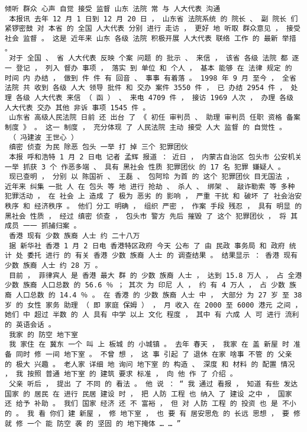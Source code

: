 \documentclass{article}
\begin{document}
\begin{Verbatim}[commandchars=\\\{\}]
 倾听 群众 心声 自觉 接受 监督 山东 法院 常 与 人大代表 沟通 
 本报讯 去年 12 月 1 日到 12 月 20 日 ， 山东省 法院系统 的 院长 、 副 院长 们 紧锣密鼓 对 本省 的 全国 人大代表 分别 进行 走访 ， 更好 地 听取 群众意见 ， 接受 社会 监督 。 这是 近年来 山东 各级 法院 积极开展 人大代表 联络 工作 的 最新 举措 。 
 对于 全国 、 省 人大代表 反映 个案 问题 的 批示 、 来信 ， 该省 各级 法院 都 逐一 登记 ， 列入 督办 事项 ， 落实 到 单位 和 个人 ， 基本 能够 在 法律 规定 的 时间 内 办结 ， 做到 件 件 有 回音 、 事事 有着落 。 1998 年 9 月 至今 ， 全省 法院 共 收到 各级 人大 领导 批件 和 交办 案件 3550 件 ， 已 办结 2954 件 ， 处理 各级 人大代表 来信 （ 函 ） 、 来电 4709 件 ， 接访 1969 人次 ， 办理 各级 人大代表 交办 其他 非诉 事项 1545 件 。 
 山东省 高级人民法院 日前 还 出台 了 《 初任 审判员 、 助理 审判员 任职 资格 备案 制度 》 。 这一 制度 ， 充分体现 了 人民法院 主动 接受 人大 监督 的 自觉性 。 
 （ 冯建波 王世心 ） 
 缜密 侦查 为民 除恶 包头 一举 打 掉 三个 犯罪团伙 
 本报 呼和浩特 1 月 2 日电 记者 孟辉 报道 ： 近日 ， 内蒙古自治区 包头市 公安机关 一举 抓获 3 个 作恶多端 、 具有 黑社会 性质 犯罪团伙 的 17 名 犯罪 嫌疑人 。 
 现已查明 ， 分别 以 陈国祈 、 王磊 、 包阿玲 为首 的 这个 犯罪团伙 目无国法 ， 近年来 纠集 一批 人 在 包头 等 地 进行 抢劫 、 杀人 、 绑架 、 敲诈勒索 等 多种 犯罪活动 ， 在 社会 上 造成 了 极为 恶劣 的 影响 ， 严重 干扰 和 破坏 了 社会治安 秩序 和 经济秩序 。 他们 分工 明确 ， 组织 严密 ， 作案 手段 残忍 ， 具有 明显 的 黑社会 性质 ， 经过 缜密 侦查 ， 包头市 警方 先后 摧毁 了 这个 犯罪团伙 ， 将 其 成员 一一 抓捕归案 。 
 香港 现有 少数 族裔 人士 约 二十八万 
 据 新华社 香港 1 月 2 日电 香港特区政府 今天 公布 了 由 民政 事务局 和 政府 统计 处 委托 进行 的 有关 香港 少数 族裔 人士 的 调查结果 。 结果显示 ： 香港 现有 少数 族裔 人士 约 28 万 。 
 目前 ， 菲律宾人 是 香港 最大 群 的 少数 族裔 人士 ， 达到 15.8 万人 ， 占 全港 少数 族裔 人口总数 的 56.6 ％ ； 其次 为 印尼 人 ， 约 有 4 万人 ， 占 少数 族裔 人口总数 的 14.4 ％ 。 在 香港 的 少数 族裔 人士 中 ， 大部分 为 27 岁 至 38 岁 的 女性 家务 助理 （ 即 家庭 保姆 ） ， 月 收入 在 2000 至 6000 港元 之间 ， 她们 中 超过 半数 的 人 具有 中学 以上 文化 程度 ， 其中 有 六成 人 可 进行 流利 的 英语会话 。 
 我家 的 防空 地下室 
 我 家住 在 冀东 一个 叫 上 板城 的 小城镇 。 去年 春天 ， 我家 在 盖 新屋 时 准备 同时 修 一间 地下室 。 不曾 想 ， 这 事 引起 了 退休 在家 啥事 不管 的 父亲 的 极大 兴趣 。 老人家 详细 地 询问 地下室 的 构造 、 深度 和 材料 的 配置 情况 ， 我 按照 普通 地下室 的 建筑 要求 标准 ， 向 他 作 了 介绍 。 
 父亲 听后 ， 提出 了 不同 的 看法 。 他 说 ： “ 我 通过 看报 ， 知道 有些 发达国家 的 居民 在 进行 民居 建设 时 ， 把 人防 工程 也 纳入 了 建设 之中 ， 国家 还 给予 补助 。 我们 国家 经济 还 不 富裕 ， 但 对 人防 工程 的 投资 也 是 不小 的 。 我 看 你们 建 新屋 ， 修 地下室 ， 也 要 有 居安思危 的 长远 思想 ， 要 修 就 修 一个 能 防空 袭 的 坚固 的 地下掩体 … … ” 

\end{Verbatim}
\end{document}
